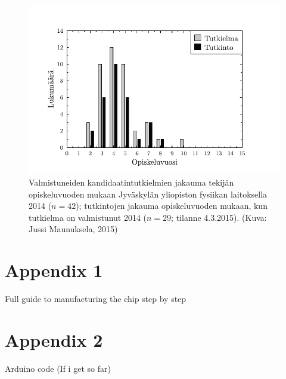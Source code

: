\documentclass[draft]{jyflluk}
\begin{document}
\begin{figure}[htp]
   \centering
   \includegraphics[width=\textwidth]{tutkinnot}
   \caption{Valmistuneiden kandidaatintutkielmien jakauma tekijän opiskeluvuoden mukaan Jyväskylän yliopiston fysiikan laitoksella 2014 ($n = 42$); tutkintojen jakauma opiskeluvuoden mukaan, kun tutkielma on valmistunut 2014 ($n = 29$; tilanne 4.3.2015). (Kuva: Jussi Maunuksela, 2015)}
   \label{fig:esim-kuvio}
\end{figure}

\nocite{*}

\printbibliography
\appendix

\section{Appendix 1}
\label{sec:appendix1}
Full guide to manufacturing the chip step by step

\section{Appendix 2}
\label{sec:appendix2}
Arduino code (If i get so far)
\end{document}
